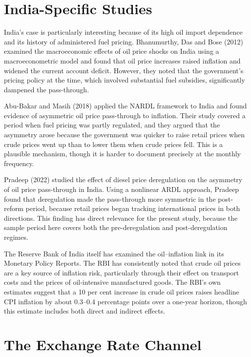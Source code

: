 \section{India-Specific Studies}

India's case is particularly interesting because of its high oil import dependence and its history of administered fuel pricing. Bhanumurthy, Das and Bose (2012) examined the macroeconomic effects of oil price shocks on India using a macroeconometric model and found that oil price increases raised inflation and widened the current account deficit. However, they noted that the government's pricing policy at the time, which involved substantial fuel subsidies, significantly dampened the pass-through.

Abu-Bakar and Masih (2018) applied the NARDL framework to India and found evidence of asymmetric oil price pass-through to inflation. Their study covered a period when fuel pricing was partly regulated, and they argued that the asymmetry arose because the government was quicker to raise retail prices when crude prices went up than to lower them when crude prices fell. This is a plausible mechanism, though it is harder to document precisely at the monthly frequency.

Pradeep (2022) studied the effect of diesel price deregulation on the asymmetry of oil price pass-through in India. Using a nonlinear ARDL approach, Pradeep found that deregulation made the pass-through more symmetric in the post-reform period, because retail prices began tracking international prices in both directions. This finding has direct relevance for the present study, because the sample period here covers both the pre-deregulation and post-deregulation regimes.

The Reserve Bank of India itself has examined the oil--inflation link in its Monetary Policy Reports. The RBI has consistently noted that crude oil prices are a key source of inflation risk, particularly through their effect on transport costs and the prices of oil-intensive manufactured goods. The RBI's own estimates suggest that a 10 per cent increase in crude oil prices raises headline CPI inflation by about 0.3--0.4 percentage points over a one-year horizon, though this estimate includes both direct and indirect effects.

\section{The Exchange Rate Channel}

